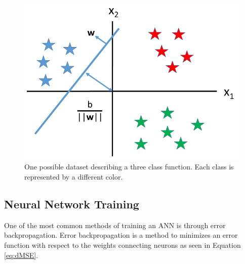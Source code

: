 

\begin{figure}[H]
	\centering
	\includegraphics[width=0.65\linewidth]{images/training_set_for_single_layer_hyperplane_v2}
	\caption{One possible dataset describing a three class function. Each class is represented by a different color.}
	\label{fig:training_set_one_layer}
\end{figure}

\subsection{Neural Network Training}

One of the most common methods of training an ANN is through error backpropagation. Error backpropagation is a method to minimizes an error function with respect to the weights connecting neurons as seen in Equation \ref{eq:dMSE}. %

